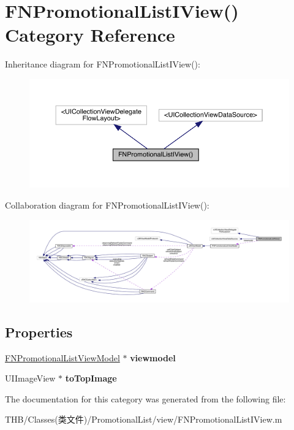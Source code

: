 \hypertarget{category_f_n_promotional_list_i_view_07_08}{}\section{F\+N\+Promotional\+List\+I\+View() Category Reference}
\label{category_f_n_promotional_list_i_view_07_08}


Inheritance diagram for F\+N\+Promotional\+List\+I\+View()\+:\nopagebreak
\begin{figure}[H]
\begin{center}
\leavevmode
\includegraphics[width=350pt]{category_f_n_promotional_list_i_view_07_08__inherit__graph}
\end{center}
\end{figure}


Collaboration diagram for F\+N\+Promotional\+List\+I\+View()\+:\nopagebreak
\begin{figure}[H]
\begin{center}
\leavevmode
\includegraphics[width=350pt]{category_f_n_promotional_list_i_view_07_08__coll__graph}
\end{center}
\end{figure}
\subsection*{Properties}
\begin{DoxyCompactItemize}
\item 
\mbox{\label{category_f_n_promotional_list_i_view_07_08_a43657d40a4d604193b1d04900985236c}} 
\mbox{\hyperlink{interface_f_n_promotional_list_view_model}{F\+N\+Promotional\+List\+View\+Model}} $\ast$ {\bfseries viewmodel}
\item 
\mbox{\label{category_f_n_promotional_list_i_view_07_08_ae4f5b56525cc3c3a621c08775a5af58b}} 
U\+I\+Image\+View $\ast$ {\bfseries to\+Top\+Image}
\end{DoxyCompactItemize}


The documentation for this category was generated from the following file\+:\begin{DoxyCompactItemize}
\item 
T\+H\+B/\+Classes(类文件)/\+Promotional\+List/view/F\+N\+Promotional\+List\+I\+View.\+m\end{DoxyCompactItemize}
